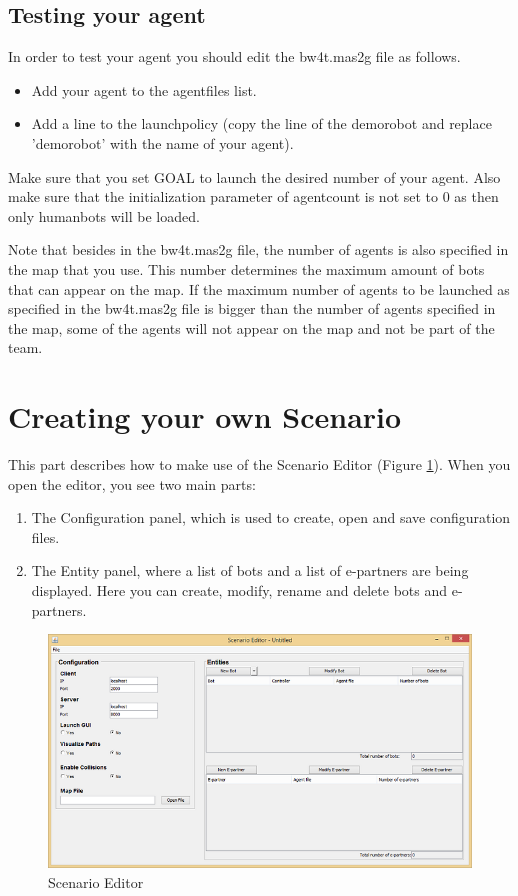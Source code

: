 \documentclass[11pt,a4paper]{article}
\begin{document}
\subsection{Testing your agent}
In order to test your agent you should edit the bw4t.mas2g file as follows.
\begin{itemize}
\item Add your agent to the agentfiles list.
\item Add a line to the launchpolicy (copy the line of the demorobot and replace 'demorobot' with the name of your agent).
\end{itemize}
Make sure that you set GOAL to launch the desired number of your agent. Also make sure that the initialization parameter of agentcount is not set to 0 as then only humanbots will be loaded.

Note that besides in the bw4t.mas2g file, the number of agents is also specified in the map that you use. This number determines the maximum amount of bots that can appear on the map. If the maximum number of agents to be launched as specified in the bw4t.mas2g file is bigger than the number of agents specified in the map, some of the agents will not appear on the map and not be part of the team. 

\section{Creating your own Scenario}
This part describes how to make use of the Scenario Editor (Figure \ref{fig:ScenarioEditor}). When you open the editor, you see two main parts:
\begin{enumerate}
\item The Configuration panel, which is used to create, open and save configuration files.
\item The Entity panel, where a list of bots and a list of e-partners are being displayed. Here you can create, modify, rename and delete bots and e-partners.
\end{enumerate}

\begin{figure}[h]
\begin{center}
\includegraphics[width=\textwidth]{editor.png}
\caption{Scenario Editor}\label{fig:ScenarioEditor}
\end{center}
\end{figure}
\end{document}
